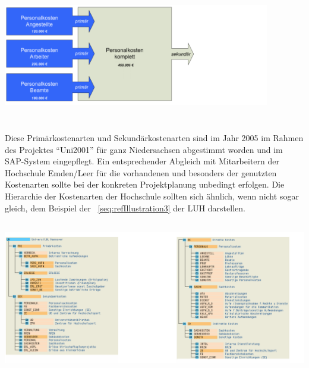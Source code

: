 \documentclass[a4paper]{article}
\makeatletter
\newcommand\captionof[1]{\def\@captype{#1}\caption}
\makeatother
\begin{document}
{\centering \includegraphics[width=11.67cm,height=5.884cm]{INMAusarbeitung02-img/INMAusarbeitung02-img003.png}
\captionof{figure}[U\"{ }bergang von Prima\"{ }r{}- in Sekunda\"{ }rkostenarten (Handbuch Kostenartenrechnung
05)]{\"{U}bergang von Prim\"{a}r- in Sekund\"{a}rkostenarten\textcolor[rgb]{1.0,0.2,0.2}{ (Handbuch Kostenartenrechnung
05}\textcolor{red}{)}}
\label{seq:refIllustration2}
\par}
{\sffamily
Diese Primärkostenarten und Sekundärkostenarten sind im Jahr 2005 im Rahmen des Projektes “Uni2001” für ganz
Niedersachsen abgestimmt worden und im SAP-System eingepflegt. Ein entsprechender Abgleich mit Mitarbeitern der
Hochschule Emden/Leer für die vorhandenen und besonders der genutzten Kostenarten sollte bei der konkreten
Projektplanung unbedingt erfolgen. Die Hierarchie der Kostenarten der Hochschule sollten sich ähnlich, wenn nicht sogar
gleich, dem Beispiel der \figurename~\ref{seq:refIllustration3} der LUH darstellen.}

{\centering \includegraphics[width=15.385cm,height=6.706cm]{INMAusarbeitung02-img/INMAusarbeitung02-img004.png}
\captionof{figure}[ \ Kostenartenhierarchie der Hochschulen Uni2001 (Handbuch Kostenartenrechnung 05)]{
\ Kostenartenhierarchie der Hochschulen Uni2001\textcolor[rgb]{1.0,0.2,0.2}{ (Handbuch Kostenartenrechnung
05}\textcolor{red}{)}}
\label{seq:refIllustration3}
\par}
\end{document}
